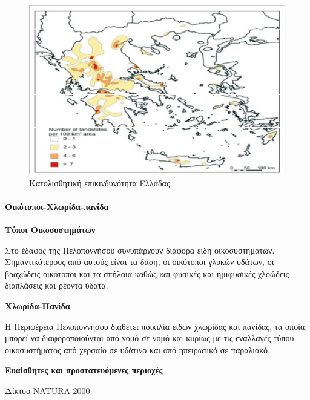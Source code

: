 \documentclass[12pt]{article}
\begin{document}
	\begin{figure} [H]
		\begin{center}
			\includegraphics [scale = 0.80] {katolisthiseis.png}
			\caption{Κατολισθητική επικινδυνότητα Ελλάδας}
			\label{katolisthiseis}
		\end{center}
	\end{figure}
	
	\paragraph{Οικότοποι-Χλωρίδα-πανίδα}
	
	\textbf{Τύποι Οικοσυστημάτων}
	
	Στο έδαφος της Πελοποννήσου συνυπάρχουν διάφορα είδη οικοσυστημάτων. Σημαντικότερους από αυτούς είναι τα δάση, οι οικότοποι γλυκών υδάτων, οι βραχώδεις οικότοποι και τα σπήλαια καθώς και φυσικές και ημιφυσικές χλοώδεις διαπλάσεις και ρέοντα ύδατα.
	
	\textbf{Χλωρίδα-Πανίδα}
	
	Η Περιφέρεια Πελοποννήσου διαθέτει ποικιλία ειδών χλωρίδας και πανίδας,  τα οποία μπορεί να διαφοροποιούνται από νομό σε νομό και κυρίως με τις εναλλαγές τύπου οικοσυστήματος από χερσαίο σε υδάτινο και από ηπειρωτικό σε παραλιακό.
	
	\textbf{Ευαίσθητες και προστατευόμενες περιοχές}
	
	\underline{Δίκτυο NATURA 2000}
	
\end{document}
